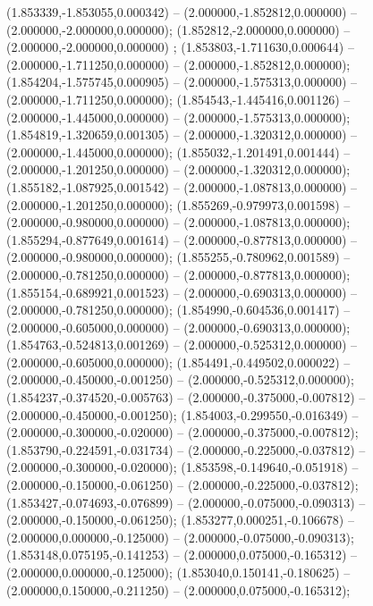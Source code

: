  (1.853339,-1.853055,0.000342) -- (2.000000,-1.852812,0.000000) -- (2.000000,-2.000000,0.000000);
 (1.852812,-2.000000,0.000000) -- (2.000000,-2.000000,0.000000) ;
 (1.853803,-1.711630,0.000644) -- (2.000000,-1.711250,0.000000) -- (2.000000,-1.852812,0.000000);
 (1.854204,-1.575745,0.000905) -- (2.000000,-1.575313,0.000000) -- (2.000000,-1.711250,0.000000);
 (1.854543,-1.445416,0.001126) -- (2.000000,-1.445000,0.000000) -- (2.000000,-1.575313,0.000000);
 (1.854819,-1.320659,0.001305) -- (2.000000,-1.320312,0.000000) -- (2.000000,-1.445000,0.000000);
 (1.855032,-1.201491,0.001444) -- (2.000000,-1.201250,0.000000) -- (2.000000,-1.320312,0.000000);
 (1.855182,-1.087925,0.001542) -- (2.000000,-1.087813,0.000000) -- (2.000000,-1.201250,0.000000);
 (1.855269,-0.979973,0.001598) -- (2.000000,-0.980000,0.000000) -- (2.000000,-1.087813,0.000000);
 (1.855294,-0.877649,0.001614) -- (2.000000,-0.877813,0.000000) -- (2.000000,-0.980000,0.000000);
 (1.855255,-0.780962,0.001589) -- (2.000000,-0.781250,0.000000) -- (2.000000,-0.877813,0.000000);
 (1.855154,-0.689921,0.001523) -- (2.000000,-0.690313,0.000000) -- (2.000000,-0.781250,0.000000);
 (1.854990,-0.604536,0.001417) -- (2.000000,-0.605000,0.000000) -- (2.000000,-0.690313,0.000000);
 (1.854763,-0.524813,0.001269) -- (2.000000,-0.525312,0.000000) -- (2.000000,-0.605000,0.000000);
 (1.854491,-0.449502,0.000022) -- (2.000000,-0.450000,-0.001250) -- (2.000000,-0.525312,0.000000);
 (1.854237,-0.374520,-0.005763) -- (2.000000,-0.375000,-0.007812) -- (2.000000,-0.450000,-0.001250);
 (1.854003,-0.299550,-0.016349) -- (2.000000,-0.300000,-0.020000) -- (2.000000,-0.375000,-0.007812);
 (1.853790,-0.224591,-0.031734) -- (2.000000,-0.225000,-0.037812) -- (2.000000,-0.300000,-0.020000);
 (1.853598,-0.149640,-0.051918) -- (2.000000,-0.150000,-0.061250) -- (2.000000,-0.225000,-0.037812);
 (1.853427,-0.074693,-0.076899) -- (2.000000,-0.075000,-0.090313) -- (2.000000,-0.150000,-0.061250);
 (1.853277,0.000251,-0.106678) -- (2.000000,0.000000,-0.125000) -- (2.000000,-0.075000,-0.090313);
 (1.853148,0.075195,-0.141253) -- (2.000000,0.075000,-0.165312) -- (2.000000,0.000000,-0.125000);
 (1.853040,0.150141,-0.180625) -- (2.000000,0.150000,-0.211250) -- (2.000000,0.075000,-0.165312);
